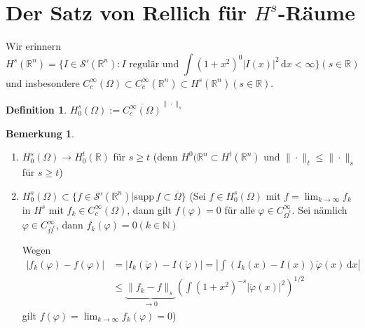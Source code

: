 \documentclass[
paper=a4,
bibtotocnumbered,
liststotocnumbered,
tablecaptionabove,
pointlessnumbers,
twoside,
openright,
10pt
]
{report}
\newcommand{\supp}{\mathrm{supp}\,}
\let\phi\varphi
\newtheorem{df}[thm]{Definition}
\theoremstyle{definition}
\newtheorem*{rem}{Bemerkung}
\numberwithin{equation}{chapter}
\begin{document}
\section{Der Satz von Rellich für $H^s$-Räume}

Wir erinnern
\begin{equation}
H^s(\mathbb R^n) = \{I\in \mathcal S'(\mathbb R^n): I \text{ regulär und } \int (1+x^2)^0 |I(x)|^2\, \mathrm dx <\infty\} (s\in \mathbb R) 
\end{equation}
und insbesondere $C_c^\infty(\Omega) \subset C_c^\infty(\mathbb R^n) \subset H^s(\mathbb R^n) (s\in \mathbb R)$.

\begin{df}
$H_0^s(\Omega) := \overline{C_c^\infty(\Omega)}^{\|\cdot\|_s}$
\end{df}
\begin{rem}
\begin{enumerate}
\item $H_0^s(\Omega) \to H_0^t (\mathbb R)$ für $s\ge t$ (denn $H^0(\mathbb R^n\subset H^t(\mathbb R^n)$ und $\|\cdot \|_t \le \| \cdot \|_s$ für $s\ge t$)

\item $H_0^s(\Omega) \subset \{f\in \mathcal S'(\mathbb R^n)|\supp f\subset \overline{\Omega}\}$
(Sei $f\in H_0^s(\Omega)$ mit $f=\lim_{k\to \infty} f_k$ in $H^s$ mit $f_k \in C_c^\infty(\Omega)$, dann gilt $f(\phi)=0$ für alle $\phi \in C_{\overline{\Omega}^c}^\infty$. Sei nämlich $\phi \in C_{\overline{\Omega}^c}^\infty$, dann $f_k(\phi) =0 (k\in \mathbb N)$

Wegen 
\begin{align*}
|f_k(\phi)-f(\phi)| &=|I_k(\check \phi) - I(\check \phi)| = |\int (I_k(x)-I(x))\check \phi(x)\, \mathrm dx|\\
 &\le \underbrace{\|f_k-f\|_s}_{\to 0} \left ( \int (1+x^2)^{-s} |\check \phi(x)|^2 \right )^{1/2}
\end{align*}
gilt $f(\phi) = \lim_{k\to \infty} f_k(\phi) =0$)
\end{enumerate}
\end{rem}
\end{document}
